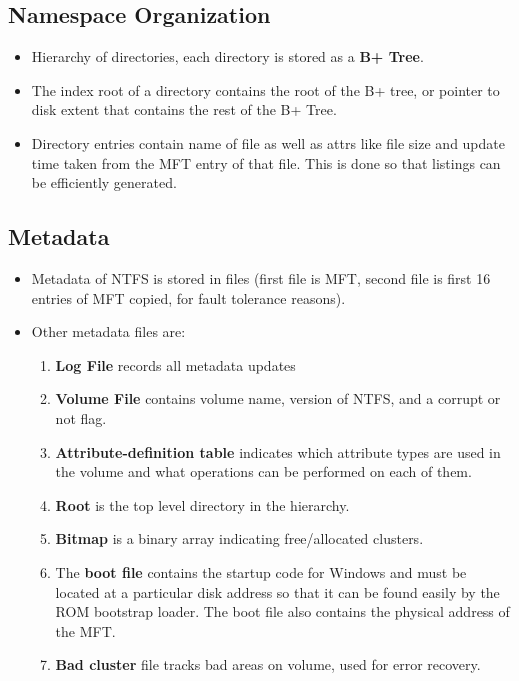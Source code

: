 \documentclass{article}
\theoremstyle{plain}
\theoremstyle{definition}
\begin{document}
\subsection{Namespace Organization}
\begin{itemize}
    \item Hierarchy of directories, each directory is stored as a \textbf{B+ Tree}. 
    
    \item The index root of a directory contains the root of the B+ tree, or pointer to disk extent that contains the rest of the B+ Tree. 
    
    \item Directory entries contain name of file as well as attrs like file size and update time taken from the MFT entry of that file. This is done so that listings can be efficiently generated. 
\end{itemize}

\subsection{Metadata}
\begin{itemize}
    \item Metadata of NTFS is stored in files (first file is MFT, second file is first 16 entries of MFT copied, for fault tolerance reasons). 
    
    \item Other metadata files are:
    \begin{enumerate}
        \item \textbf{Log File} records all metadata updates
        
        \item \textbf{Volume File} contains volume name, version of NTFS, and a corrupt or not flag. 
        
        \item \textbf{Attribute-definition table} indicates which attribute types are used in the volume and what operations can be performed on each of them.
        
        \item \textbf{Root} is the top level directory in the hierarchy.
        
        \item \textbf{Bitmap} is a binary array indicating free/allocated clusters.
        
        \item The\textbf{ boot file} contains the startup code for Windows and must be located at a particular disk address so that it can be found easily by the ROM bootstrap loader. The boot file also contains the physical address of the MFT.
        
        \item \textbf{Bad cluster} file tracks bad areas on volume, used for error recovery.
    \end{enumerate}
\end{itemize}
\end{document}
